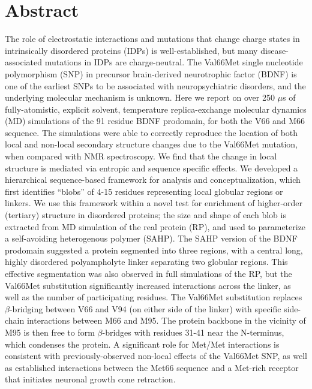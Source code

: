 \documentclass[10pt,letterpaper]{article}
\begin{document}
\section*{Abstract}
The role of electrostatic interactions and mutations that change charge states in intrinsically disordered proteins (IDPs) is well-established, but many disease-associated mutations in IDPs are charge-neutral. The Val66Met single nucleotide polymorphism (SNP) in precursor brain-derived neurotrophic factor (BDNF) is one of the earliest SNPs to be associated with neuropsychiatric disorders, and the underlying molecular mechanism is unknown. Here we report on over 250 $\mu$s of fully-atomistic, explicit solvent, temperature replica-exchange molecular dynamics (MD) simulations of the 91 residue BDNF prodomain, for both the V66 and M66 sequence. The simulations were able to correctly reproduce the location of both local and non-local secondary structure changes due to the Val66Met mutation, when compared with NMR spectroscopy. We find that the change in local structure is mediated via entropic and sequence specific effects. We developed a hierarchical sequence-based framework for analysis and conceptualization, which first identifies ``blobs'' of 4-15 residues representing local globular regions or linkers. We use this framework within a novel test for enrichment of higher-order (tertiary) structure in disordered proteins; the size and shape of each blob is extracted from MD simulation of the real protein (RP), and used to parameterize a self-avoiding heterogenous polymer (SAHP). The SAHP version of the BDNF prodomain suggested a protein segmented into three regions, with a central long, highly disordered polyampholyte linker separating two globular regions. This effective segmentation was also observed in full simulations of the RP, but the Val66Met substitution significantly increased interactions across the linker, as well as the number of participating residues. The Val66Met substitution replaces $\beta$-bridging between V66 and V94 (on either side of the linker) with specific side-chain interactions between M66 and M95. The protein backbone in the vicinity of M95 is then free to form $\beta$-bridges with residues 31-41 near the N-terminus, which condenses the protein. A significant role for Met/Met interactions is consistent with previously-observed non-local effects of the Val66Met SNP, as well as established interactions between the Met66 sequence and a Met-rich receptor that initiates neuronal growth cone retraction. 
\end{document}
